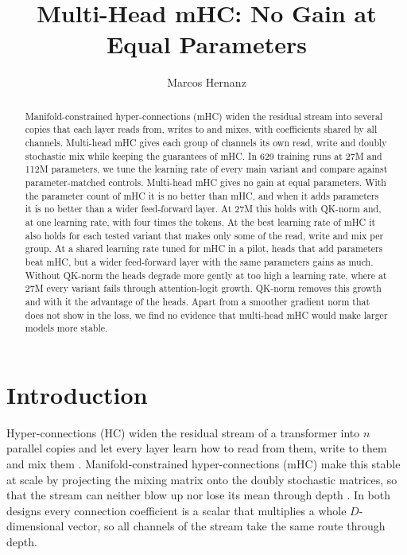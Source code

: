 \documentclass[11pt, a4paper]{article}
\title{Multi-Head mHC: No Gain at Equal Parameters}
\author{Marcos Hernanz}
\begin{document}
\maketitle

\begin{abstract}
   Manifold-constrained hyper-connections (mHC) widen the residual stream into several copies that each layer reads from, writes to
  and mixes, with coefficients shared by all channels. Multi-head mHC gives each group of channels its own read, write
  and doubly stochastic mix while keeping the guarantees of mHC. In 629 training runs at 27M and 112M parameters, we tune the
  learning rate of every main variant and compare against parameter-matched controls. Multi-head mHC gives no gain at equal
  parameters. With the parameter count of mHC it is no better than mHC, and when it adds parameters it is no better than a wider
  feed-forward layer. At 27M this holds with QK-norm and, at one learning rate, with four times the tokens. At the best learning
  rate of mHC it also holds for each tested variant that makes only some of the read, write and mix per group. At a shared learning rate tuned for mHC in a pilot, heads
  that add parameters beat mHC, but a wider feed-forward layer with the same parameters gains as much. Without QK-norm the heads
  degrade more gently at too high a learning rate, where at 27M every variant fails through attention-logit growth. QK-norm removes this
  growth and with it the advantage of the heads. Apart from a smoother gradient norm that does not show in the loss, we find no
  evidence that multi-head mHC would make larger models more stable.
\end{abstract}

\tableofcontents

\section{Introduction}
\label{sec:introduction}

Hyper-connections (HC) widen the residual stream of a transformer into $n$ parallel copies and let every layer learn how to read
from them, write to them and mix them \citep{zhu2024hyperconnections}. Manifold-constrained hyper-connections (mHC) make this stable
at scale by projecting the mixing matrix onto the doubly stochastic matrices, so that the stream can neither blow up nor lose its
mean through depth \citep{xie2026mhc}. In both designs every connection coefficient is a scalar that multiplies a whole
$D$-dimensional vector, so all channels of the stream take the same route through depth.
\end{document}
